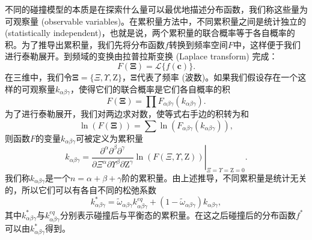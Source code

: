 不同的碰撞模型的本质是在探索什么量可以最优地描述分布函数，我们称这些量为可观察量 (observable variables)。在累积量方法中，不同累积量之间是统计独立的 (statistically independent)，也就是说，两个累积量的联合概率等于各自概率的积。为了推导出累积量，我们先将分布函数$f$转换到频率空间$F$中，这样便于我们进行泰勒展开。到频域的变换由拉普拉斯变换 (Laplace transform) 完成：
\begin{equation}
F(\boldsymbol{\Xi})=\mathcal{L}\{f(\boldsymbol{c})\}.
\end{equation}
在三维中，我们令$\boldsymbol{\Xi}=\{\Xi, \Upsilon, \mathrm{Z}\}$，$\boldsymbol{\Xi}$代表了频率 (波数)。如果我们假设存在一个这样的可观察量$k_{\alpha\beta\gamma}$，使得它们的联合概率是它们各自概率的积
\begin{equation}
F(\boldsymbol{\Xi})=\prod F_{\alpha \beta \gamma}\left(k_{\alpha \beta \gamma}\right).
\end{equation}
为了进行泰勒展开，我们对两边求对数，使等式右手边的积转为和
\begin{equation}
\ln (F(\boldsymbol{\Xi}))=\sum \ln \left(F_{\alpha \beta \gamma}\left(k_{\alpha \beta \gamma}\right)\right),
\end{equation}
则函数$F$的变量$k_{\alpha \beta \gamma}$可被定义为累积量
\begin{equation}
k_{\alpha \beta \gamma}=\left. \frac{\partial^{\alpha} \partial^{\beta} \partial^{\gamma}}{\partial \Xi^{\alpha} \partial \Upsilon^{\beta} \partial \mathrm{Z}^{\gamma}} \ln (F(\Xi, \Upsilon, \mathrm{Z}))\right|_{\Xi=\Upsilon=\mathrm{Z}=0}.
\end{equation}
我们称$k_{\alpha \beta \gamma}$是一个$n=\alpha+\beta+\gamma$阶的累积量。由上述推导，不同累积量是统计无关的，所以它们可以有各自不同的松弛系数
\begin{equation}
k_{\alpha \beta \gamma}^{*}=\tilde{\omega}_{\alpha \beta \gamma} k_{\alpha \beta \gamma}^{e q}+\left(1-\tilde{\omega}_{\alpha \beta \gamma}\right) k_{\alpha \beta \gamma},
\end{equation}
其中$k_{\alpha \beta \gamma}^{*}$与$k_{\alpha \beta \gamma}^{eq}$分别表示碰撞后与平衡态的累积量。在这之后碰撞后的分布函数$f^*$可以由$k_{\alpha \beta \gamma}^{*}$得到。

